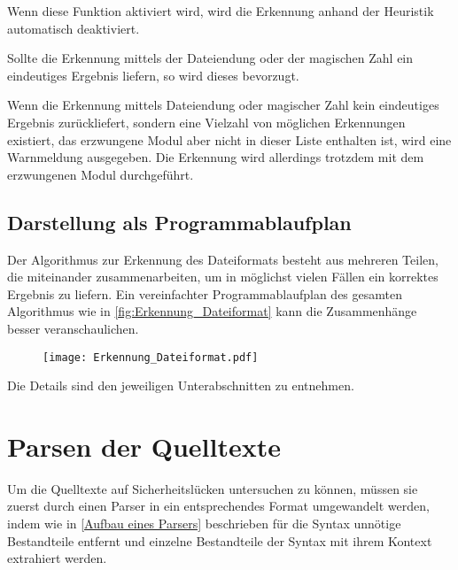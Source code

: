             Wenn diese Funktion aktiviert wird,
            wird die Erkennung anhand der Heuristik automatisch deaktiviert.

            Sollte die Erkennung mittels der Dateiendung oder
            der magischen Zahl ein eindeutiges Ergebnis liefern,
            so wird dieses bevorzugt.

            Wenn die Erkennung mittels Dateiendung oder
            magischer Zahl kein eindeutiges Ergebnis zurückliefert,
            sondern eine Vielzahl von möglichen Erkennungen existiert,
            das erzwungene Modul aber nicht in dieser Liste enthalten ist,
            wird eine Warnmeldung ausgegeben.
            Die Erkennung wird allerdings trotzdem mit dem erzwungenen Modul durchgeführt.

        \subsection{Darstellung als Programmablaufplan}
            Der Algorithmus zur Erkennung des Dateiformats besteht aus mehreren Teilen,
            die miteinander zusammenarbeiten,
            um in möglichst vielen Fällen ein korrektes Ergebnis zu liefern.
            Ein vereinfachter Programmablaufplan des gesamten Algorithmus wie in
            \vref{fig:Erkennung_Dateiformat} kann die Zusammenhänge besser veranschaulichen.

            \begin{figure}[htp]
                \centering%
                \texttt{[image: Erkennung\_Dateiformat.pdf]}
                \label{fig:Erkennung_Dateiformat}
            \end{figure}

            Die Details sind den jeweiligen Unterabschnitten zu entnehmen.

    \section{Parsen der Quelltexte}\label{Parsen der Quelltexte}
        Um die Quelltexte auf Sicherheitslücken untersuchen zu können,
        müssen sie zuerst durch einen Parser in ein entsprechendes Format umgewandelt werden,
        indem
        wie in
        \vref{Aufbau eines Parsers} beschrieben für die Syntax unnötige Bestandteile entfernt und
        einzelne Bestandteile der Syntax mit ihrem Kontext extrahiert werden.

